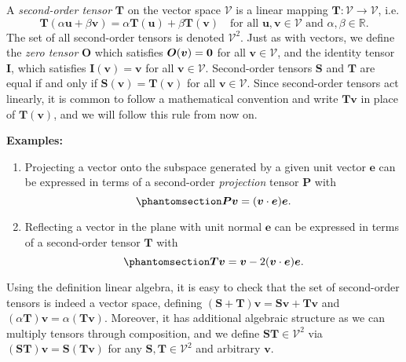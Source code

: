 \documentclass[
  letterpaper,
  DIV=11,
  numbers=noendperiod]{scrreprt}
\theoremstyle{plain}
\theoremstyle{remark}
\begin{document}
A \emph{second-order tensor} \({\boldsymbol{T}}\) on the vector space
\({\mathcal{V}}\) is a linear mapping
\({\boldsymbol{T}}:{\mathcal{V}}\to{\mathcal{V}}\), i.e.
\[{\boldsymbol{T}}(\alpha {\boldsymbol{u}}+\beta {\boldsymbol{v}}) = \alpha {\boldsymbol{T}}({\boldsymbol{u}})+\beta{\boldsymbol{T}}({\boldsymbol{v}})\quad\text{for all }{\boldsymbol{u}},{\boldsymbol{v}}\in{\mathcal{V}}\text{ and }\alpha,\beta\in{\mathbb{R}}.\]
The set of all second-order tensors is denoted \({\mathcal{V}}^2\). Just
as with vectors, we define the \emph{zero tensor} \({\boldsymbol{O}}\)
which satisfies \({\boldsymbol{O}}({\boldsymbol{v}}) = \bf0\) for all
\({\boldsymbol{v}}\in{\mathcal{V}}\), and the identity tensor
\({\boldsymbol{I}}\), which satisfies
\({\boldsymbol{I}}({\boldsymbol{v}}) = {\boldsymbol{v}}\) for all
\({\boldsymbol{v}}\in{\mathcal{V}}\). Second-order tensors
\({\boldsymbol{S}}\) and \({\boldsymbol{T}}\) are equal if and only if
\({\boldsymbol{S}}({\boldsymbol{v}}) = {\boldsymbol{T}}({\boldsymbol{v}})\)
for all \({\boldsymbol{v}}\in{\mathcal{V}}\). Since second-order tensors
act linearly, it is common to follow a mathematical convention and write
\({\boldsymbol{T}}{\boldsymbol{v}}\) in place of
\({\boldsymbol{T}}({\boldsymbol{v}})\), and we will follow this rule
from now on.

\textbf{Examples:}

\begin{enumerate}
\def\labelenumi{\arabic{enumi}.}
\item
  Projecting a vector onto the subspace generated by a given unit vector
  \({\boldsymbol{e}}\) can be expressed in terms of a second-order
  \emph{projection} tensor \({\boldsymbol{P}}\) with
  \begin{equation}\phantomsection\label{eq-ProjExample}{
  {\boldsymbol{P}}{\boldsymbol{v}}= ({\boldsymbol{v}}\cdot{\boldsymbol{e}}){\boldsymbol{e}}.
  }\end{equation}
\item
  Reflecting a vector in the plane with unit normal \({\boldsymbol{e}}\)
  can be expressed in terms of a second-order tensor
  \({\boldsymbol{T}}\) with
  \begin{equation}\phantomsection\label{eq-ReflExample}{
  {\boldsymbol{T}}{\boldsymbol{v}}= {\boldsymbol{v}}-2({\boldsymbol{v}}\cdot{\boldsymbol{e}}){\boldsymbol{e}}.
  }\end{equation}
\end{enumerate}

Using the definition linear algebra, it is easy to check that the set of
second-order tensors is indeed a vector space, defining
\(({\boldsymbol{S}}+{\boldsymbol{T}}){\boldsymbol{v}}= {\boldsymbol{S}}{\boldsymbol{v}}+{\boldsymbol{T}}{\boldsymbol{v}}\)
and
\((\alpha{\boldsymbol{T}}){\boldsymbol{v}}=\alpha({\boldsymbol{T}}{\boldsymbol{v}})\).
Moreover, it has additional algebraic structure as we can multiply
tensors through composition, and we define
\({\boldsymbol{S}}{\boldsymbol{T}}\in{\mathcal{V}}^2\) via
\(({\boldsymbol{S}}{\boldsymbol{T}}){\boldsymbol{v}}= {\boldsymbol{S}}({\boldsymbol{T}}{\boldsymbol{v}})\)
for any \({\boldsymbol{S}},{\boldsymbol{T}}\in{\mathcal{V}}^2\) and
arbitrary \({\boldsymbol{v}}\).
\end{document}
